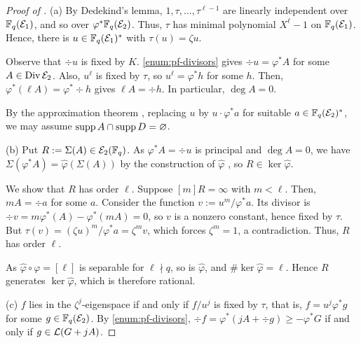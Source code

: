 \documentclass[twocolumn, 11pt]{scrartcl}
\begin{document}
\begin{proof}[Proof of ]\label{proof:pullback-eigen}
(a) By Dedekind's lemma, $1,\tau,\hdots,\tau^{\ell-1}$ are linearly independent over $\mathbb{F}_q(\mathcal{E}_1)$, and so over $\varphi^*\mathbb{F}_q(\mathcal{E}_2)$. Thus, $\tau$ has minimal polynomial $X^\ell-1$ on $\mathbb{F}_q(\mathcal{E}_1)$. Hence, there is $u\in\mathbb{F}_q(\mathcal{E}_1)^*$ with $\tau(u)=\zeta u$.
    
    Observe that $\div u$ is fixed by $K$. \ref{enum:pf-divisors} gives $\div u=\varphi^*A$ for some $A\in\operatorname{Div}\mathcal{E}_2$. Also, $u^\ell$ is fixed by $\tau$, so $u^\ell=\varphi^*h$ for some $h$. Then, $\varphi^*(\ell A)=\varphi^*\div h$ gives $\ell A=\div h$. In particular, $\deg A=0$.
    
    By the approximation theorem \cite[Thm.~1.3.1]{stichtenoth2009algebraic}, replacing $u$ by $u\cdot\varphi^*a$ for suitable $a\in\mathbb{F}_q(\mathcal{E}_2)^*$, we may assume $\operatorname{supp} A\cap\operatorname{supp} D=\varnothing$.
    
(b) Put $R:=\Sigma(A)\in\mathcal{E}_2(\mathbb{F}_q)$. As $\varphi^*A=\div u$ is principal and $\deg A=0$, we have $\Sigma(\varphi^*A)=\hat\varphi(\Sigma(A))$ by the construction of $\hat\varphi$ \cite[\S III.6]{silverman2009arithmetic}, so $R\in\ker\hat\varphi$.

We show that $R$ has order $\ell$. Suppose $[m]R=\infty$ with $m<\ell$. Then, $mA=\div a$ for some $a$. Consider the function $v:=u^m/\varphi^*a$. Its divisor is $\div v=m\varphi^*(A)-\varphi^*(mA)=0$, so $v$ is a nonzero constant, hence fixed by $\tau$. But $\tau(v)=(\zeta u)^m/\varphi^*a=\zeta^m v$, which forces $\zeta^m=1$, a contradiction. Thus, $R$ has order $\ell$.

As $\hat\varphi\circ\varphi=[\ell]$ is separable for $\ell\nmid q$, so is $\hat\varphi$, and $\#\ker\hat\varphi=\ell$. Hence $R$ generates $\ker\hat\varphi$, which is therefore rational.
    
(c) $f$ lies in the $\zeta^j$-eigenspace if and only if $f/u^j$ is fixed by $\tau$, that is, $f=u^j\varphi^*g$ for some $g\in\mathbb{F}_q(\mathcal{E}_2)$. By \ref{enum:pf-divisors}, $\div f=\varphi^*(jA+\div g)\geq-\varphi^*G$ if and only if $g\in\mathcal{L}(G+jA)$.
\end{proof}
\end{document}
